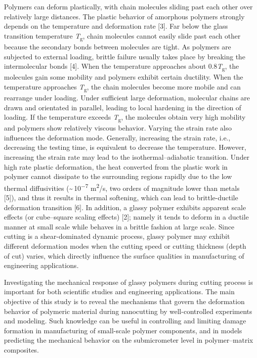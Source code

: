 \documentclass{article}
\begin{document}
Polymers can deform plastically, with chain molecules sliding past each other over relatively large distances. The plastic behavior of amorphous polymers strongly depends on the temperature and deformation rate [3]. Far below the glass transition temperature \emph{T}\textsubscript{g}, chain molecules cannot easily slide past each other because the secondary bonds between molecules are tight. As polymers are subjected to external loading, brittle failure usually takes place by breaking the intermolecular bonds [4]. When the temperature approaches about 0.8\emph{T}\textsubscript{g}, the molecules gain some mobility and polymers exhibit certain ductility. When the temperature approaches \emph{T}\textsubscript{g}, the chain molecules become more mobile and can rearrange under loading. Under sufficient large deformation, molecular chains are drawn and orientated in parallel, leading to local hardening in the direction of loading. If the temperature exceeds \emph{T}\textsubscript{g}, the molecules obtain very high mobility and polymers show relatively viscous behavior. Varying the strain rate also influences the deformation mode. Generally, increasing the strain rate, i.e., decreasing the testing time, is equivalent to decrease the temperature. However, increasing the strain rate may lead to the isothermal–adiabatic transition. Under high rate plastic deformation, the heat converted from the plastic work in polymer cannot dissipate to the surrounding regions rapidly due to the low thermal diffusivities (\textasciitilde\,10\textsuperscript{−7} m\textsuperscript{2}/s, two orders of magnitude lower than metals [5]), and thus it results in thermal softening, which can lead to brittle-ductile deformation transition [6]. In addition, a glassy polymer exhibits apparent scale effects (or cube–square scaling effects) [2]; namely it tends to deform in a ductile manner at small scale while behaves in a brittle fashion at large scale. Since cutting is a shear-dominated dynamic process, glassy polymer may exhibit different deformation modes when the cutting speed or cutting thickness (depth of cut) varies, which directly influence the surface qualities in manufacturing of engineering applications.

Investigating the mechanical response of glassy polymers during cutting process is important for both scientific studies and engineering applications. The main objective of this study is to reveal the mechanisms that govern the deformation behavior of polymeric material during nanocutting by well-controlled experiments and modeling. Such knowledge can be useful in controlling and limiting damage formation in manufacturing of small-scale polymer components, and in models predicting the mechanical behavior on the submicrometer level in polymer–matrix composites.
\end{document}
